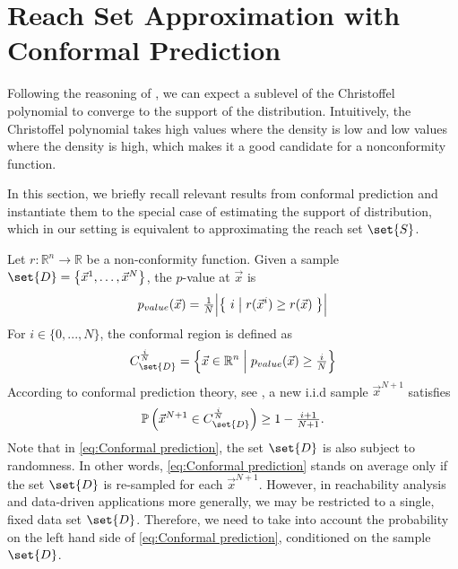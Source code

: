 \documentclass[pmlr]{jmlr}%
\begin{document}
%
%
\section{Reach Set Approximation with Conformal Prediction}\label{Reach Set Approximation with Conformal Prediction}
%
Following the reasoning of , we can expect a sublevel of the Christoffel polynomial to converge to the support of the distribution. Intuitively, the Christoffel polynomial takes high values where the density is low and low values where the density is high, which makes it a good candidate for a nonconformity function.

In this section, we briefly recall relevant results from conformal prediction and instantiate them to the special case of estimating the support of distribution, which in our setting is equivalent to approximating the reach set $\set{S}$.
%


%
Let $r: \mathbb{R}^n \rightarrow \mathbb{R}$ be a non-conformity function. %
Given a sample $\set{D} = \bigl\{ \Vec{x}^{1},\ldots, \Vec{x}^{N}\bigr\}$,
the $p$-value at $\Vec{x}$ is %
\[  p_{value}(\Vec{x})=\tfrac{1}{N}\Bigl|\bigl\{\ i  \bigm| r(\Vec{x}^i) \geq r(\Vec{x})\;\bigr\}\Bigr| \]
For $i \in \{0,..., N \}$, the conformal region is defined as
\[ 
C_{\set{D}}^{\frac{i}{N}}=\Bigl\{ \Vec{x} \in \mathbb{R}^n \Bigm| p_{value}(\Vec{x}) \geq \tfrac{i}{N}\Bigr\}
  \]
%
According to conformal prediction theory, see \cite{vovk,Anastasios}, a new i.i.d sample $\Vec{x}^{N+1}$ satisfies 
\begin{equation}\label{eq:Conformal prediction}
\mathbb{P}\left(\Vec{x}^{N+1} \in C_{\set{D}}^{\frac{i}{N}}\right) \geq 1-\tfrac{i+1}{N+1}.
\end{equation}
%
Note that in \eqref{eq:Conformal prediction}, the set $\set{D}$ is also subject to randomness. In other words, \eqref{eq:Conformal prediction} stands on average only if the set $\set{D}$ is re-sampled for each $\Vec{x}^{N+1}$. However, in reachability analysis and data-driven applications more generally, we may be restricted to a single, fixed data set $\set{D}$.  
Therefore, we need to take into account the probability on the left hand side of \eqref{eq:Conformal prediction}, conditioned on the sample $\set{D}$.
\end{document}
